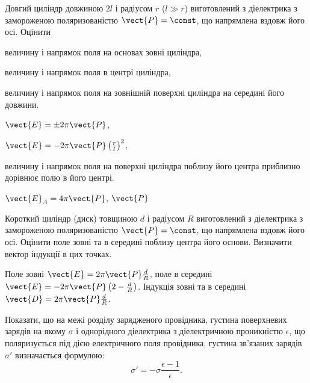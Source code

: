 \begin{problem}
	Довгий циліндр довжиною $2l$  і радіусом $r$ ($l \gg r$) виготовлений з діелектрика з замороженою поляризованістю $\vect{P} = \const$, що напрямлена вздовж його осі. Оцінити
	\begin{enumerate*}[label=\alph*)]
		\item величину і напрямок поля на основах зовні циліндра,
		\item величину і напрямок поля в центрі циліндра,
		\item величину і напрямок поля на зовнішній поверхні циліндра на середині його довжини.
	\end{enumerate*}
	\begin{solution}
		\begin{enumerate*}[label=\alph*)]
			\item $\vect{E} = \pm 2\pi \vect{P}$,
			\item $\vect{E} = -2\pi \vect{P} \left(\frac{r}{l} \right)^2$,
			\item величину і напрямок поля на поверхні циліндра поблизу його центра приблизно дорівнює полю в його центрі.
		\end{enumerate*}
		$\vect{E}_A = 4\pi \vect{P}$, $\vect{P}$
	\end{solution}
\end{problem}


\begin{problem}
	Короткий циліндр (диск) товщиною $d$ і радіусом $R$ виготовлений з діелектрика з замороженою поляризованістю $\vect{P} = \const$, що напрямлена вздовж його осі. Оцінити поле зовні та в середині поблизу центра його основи. Визначити вектор індукції в цих точках. 
	\begin{solution}
		Поле зовні $\vect{E} = 2\pi\vect{P}\frac{d}{R}$, поле в середині $\vect{E} = -2\pi\vect{P}\left( 2 - \frac{d}{R}\right) $.
		Індукція зовні та в середині $\vect{D} = 2\pi\vect{P}\frac{d}{R}$.	
	\end{solution}
\end{problem}


\begin{problem}
	Показати, що на межі розділу зарядженого провідника, густина поверхневих зарядів на якому $\sigma$ і однорідного діелектрика з діелектричною проникністю $\epsilon$, що поляризується під дією електричного поля провідника, густина зв'язаних зарядів $\sigma'$ визначається формулою:
	\[
		\sigma' = - \sigma\frac{\epsilon - 1}{\epsilon}.
	\]
\end{problem}


